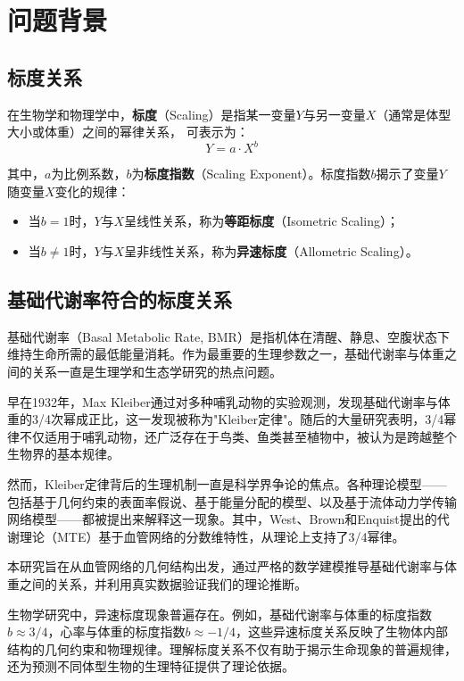 \section{问题背景}
\subsection{标度关系}
在生物学和物理学中，\textbf{标度}（Scaling）是指某一变量$Y$与另一变量$X$（通常是体型大小或体重）之间的幂律关系，
可表示为：
\begin{equation}
Y = a \cdot X^b
\label{eq:scaling-definition}
\end{equation}

其中，$a$为比例系数，$b$为\textbf{标度指数}（Scaling Exponent）。标度指数$b$揭示了变量$Y$随变量$X$变化的规律：
\begin{itemize}
    \item 当$b = 1$时，$Y$与$X$呈线性关系，称为\textbf{等距标度}（Isometric Scaling）；
    \item 当$b \neq 1$时，$Y$与$X$呈非线性关系，称为\textbf{异速标度}（Allometric Scaling）。
\end{itemize}
\subsection{基础代谢率符合的标度关系}
基础代谢率（Basal Metabolic Rate, BMR）是指机体在清醒、静息、空腹状态下维持生命所需的最低能量消耗。作为最重要的生理参数之一，基础代谢率与体重之间的关系一直是生理学和生态学研究的热点问题。

早在1932年，Max Kleiber通过对多种哺乳动物的实验观测，发现基础代谢率与体重的3/4次幂成正比，这一发现被称为"Kleiber定律"。随后的大量研究表明，3/4幂律不仅适用于哺乳动物，还广泛存在于鸟类、鱼类甚至植物中，被认为是跨越整个生物界的基本规律。

然而，Kleiber定律背后的生理机制一直是科学界争论的焦点。各种理论模型——包括基于几何约束的表面率假说、基于能量分配的模型、以及基于流体动力学传输网络模型——都被提出来解释这一现象。其中，West、Brown和Enquist提出的代谢理论（MTE）基于血管网络的分数维特性，从理论上支持了3/4幂律。

本研究旨在从血管网络的几何结构出发，通过严格的数学建模推导基础代谢率与体重之间的关系，并利用真实数据验证我们的理论推断。

生物学研究中，异速标度现象普遍存在。例如，基础代谢率与体重的标度指数$b \approx 3/4$，心率与体重的标度指数$b \approx -1/4$，这些异速标度关系反映了生物体内部结构的几何约束和物理规律。理解标度关系不仅有助于揭示生命现象的普遍规律，还为预测不同体型生物的生理特征提供了理论依据。


